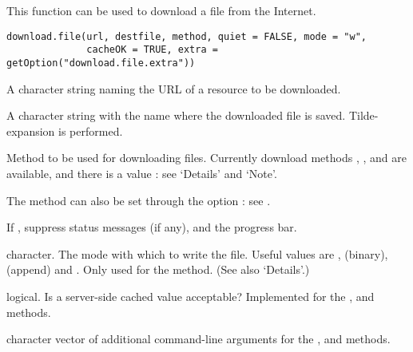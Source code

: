 %
\begin{Examples}
\end{Examples}
%
\begin{Description}\relax
This function can be used to download a file from the Internet.
\end{Description}
%
\begin{Usage}
\begin{verbatim}
download.file(url, destfile, method, quiet = FALSE, mode = "w",
              cacheOK = TRUE, extra = getOption("download.file.extra"))
\end{verbatim}
\end{Usage}
%
\begin{Arguments}
\begin{ldescription}
\item[\code{url}] A character string naming the URL of a resource to be
downloaded.

\item[\code{destfile}] A character string with the name where the downloaded
file is saved.  Tilde-expansion is performed.

\item[\code{method}] Method to be used for downloading files.  Currently
download methods , ,  and
 are available, and there is a value : see
`Details' and `Note'.

The method can also be set through the option
: see .


\item[\code{quiet}] If , suppress status messages (if any), and
the progress bar.

\item[\code{mode}] character.  The mode with which to write the file.  Useful
values are ,  (binary),  (append) and
.  Only used for the  method.
(See also `Details'.)


\item[\code{cacheOK}] logical.  Is a server-side cached value acceptable?
Implemented for the ,  and
 methods.

\item[\code{extra}] character vector of additional command-line arguments for
the ,  and  methods.
\end{ldescription}
\end{Arguments}
